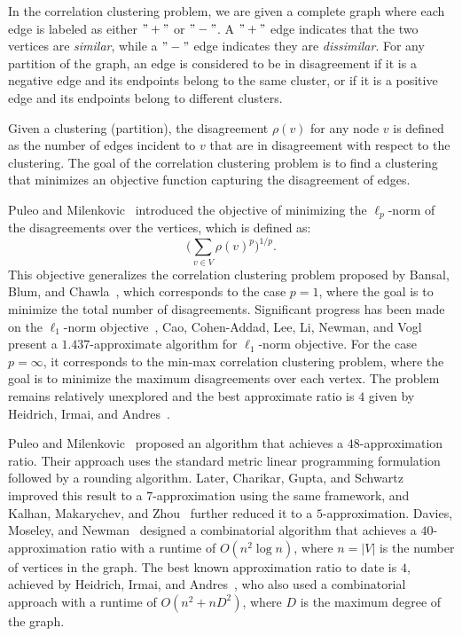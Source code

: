 In the correlation clustering problem, we are given a complete graph where each edge is labeled as either \( "+" \) or \( "-" \). A \( "+" \) edge indicates that the two vertices are \textit{similar}, while a \( "-" \) edge indicates they are \textit{dissimilar}. For any partition of the graph, an edge is considered to be in disagreement if it is a negative edge and its endpoints belong to the same cluster, or if it is a positive edge and its endpoints belong to different clusters.

Given a clustering (partition), the disagreement \( \rho(v) \) for any node \( v \) is defined as the number of edges incident to \( v \) that are in disagreement with respect to the clustering. The goal of the correlation clustering problem is to find a clustering that minimizes an objective function capturing the disagreement of edges.

Puleo and Milenkovic~\cite{PM18} introduced the objective of minimizing the \( \ell_p \)-norm of the disagreements over the vertices, which is defined as:
\[
\bigg( \sum_{v \in V} \rho(v)^p \bigg)^{1/p}.
\]
This objective generalizes the correlation clustering problem proposed by Bansal, Blum, and Chawla~\cite{BBC04}, which corresponds to the case \( p = 1 \), where the goal is to minimize the total number of disagreements. Significant progress has been made on the \( \ell_1 \)-norm objective~\cite{CGW05,ACN08,CMSY15,CLN22,CLLN23}, Cao, Cohen-Addad, Lee,
Li, Newman, and Vogl~\cite{cao2024understanding} present a $1.437$-approximate algorithm for \( \ell_1 \)-norm objective. For the case \( p = \infty \), it corresponds to the min-max correlation clustering problem, where the goal is to minimize the maximum disagreements over each vertex. The problem remains relatively unexplored and the best approximate ratio is $4$ given by Heidrich, Irmai, and Andres~\cite{heidrich20244}.

Puleo and Milenkovic~\cite{PM18} proposed an algorithm that achieves a $48$-approximation ratio. Their approach uses the standard metric linear programming formulation followed by a rounding algorithm. Later, Charikar, Gupta, and Schwartz~\cite{CGS17} improved this result to a $7$-approximation using the same framework, and Kalhan, Makarychev, and Zhou~\cite{KMZ19} further reduced it to a $5$-approximation. Davies, Moseley, and Newman~\cite{davies2023fast} designed a combinatorial algorithm that achieves a $40$-approximation ratio with a runtime of $O(n^2 \log n)$, where $n = |V|$ is the number of vertices in the graph. The best known approximation ratio to date is $4$, achieved by Heidrich, Irmai, and Andres~\cite{heidrich20244}, who also used a combinatorial approach with a runtime of $O(n^2 + n D^2)$, where $D$ is the maximum degree of the graph.



